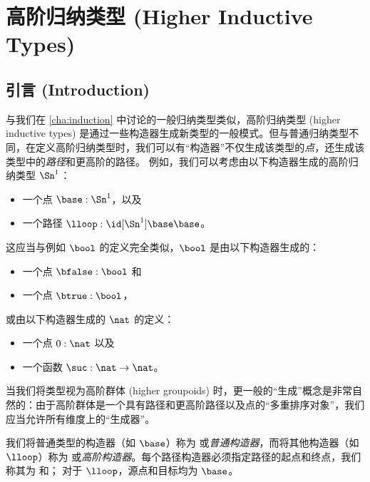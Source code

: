 \chapter{高阶归纳类型 (Higher Inductive Types)}
\label{cha:hits}

%
%
%

\section{引言 (Introduction)}
\label{sec:intro-hits}


与我们在 \cref{cha:induction} 中讨论的一般归纳类型类似，高阶归纳类型 (higher inductive types) 是通过一些构造器生成新类型的一般模式。但与普通归纳类型不同，在定义高阶归纳类型时，我们可以有“构造器”不仅生成该类型的\emph{点}，还生成该类型中的\emph{路径}和更高阶的路径。
%
%
例如，我们可以考虑由以下构造器生成的高阶归纳类型 $\Sn^1$：
\begin{itemize}
  \item 一个点 $\base:\Sn^1$，以及
  \item 一个路径 $\lloop : {\id[\Sn^1]\base\base}$。
\end{itemize}
这应当与例如 $\bool$ 的定义完全类似，$\bool$ 是由以下构造器生成的：
\begin{itemize}
  \item 一个点 $\bfalse:\bool$ 和
  \item 一个点 $\btrue:\bool$，
\end{itemize}
或由以下构造器生成的 $\nat$ 的定义：
\begin{itemize}
  \item 一个点 $0:\nat$ 以及
  \item 一个函数 $\suc:\nat\to\nat$。
\end{itemize}
当我们将类型视为高阶群体 (higher groupoids) 时，更一般的“生成”概念是非常自然的：由于高阶群体是一个具有路径和更高阶路径以及点的“多重排序对象”，我们应当允许所有维度上的“生成器”。

我们将普通类型的构造器（如 $\base$）称为%
%
或\emph{普通构造器}，而将其他构造器（如 $\lloop$）称为%
%
%
或\emph{高阶构造器}。每个路径构造器必须指定路径的起点和终点，我们称其为%
%
和；%
%
对于 $\lloop$，源点和目标均为 $\base$。

